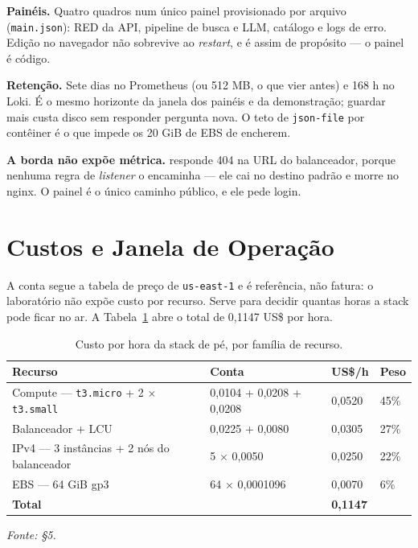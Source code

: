 \documentclass[11pt,a4paper]{article}
\begin{document}
\textbf{Painéis.} Quatro quadros num único painel provisionado por arquivo
(\texttt{main.json}): RED da API, pipeline de busca e LLM, catálogo e logs de erro. Edição no navegador não sobrevive ao
\emph{restart}, e é assim de propósito --- o painel é código.

\textbf{Retenção.} Sete dias no Prometheus (ou 512 MB, o que vier antes) e 168 h no Loki. É o mesmo
horizonte da janela dos painéis e da demonstração; guardar mais custa disco sem responder pergunta
nova. O teto de \texttt{json-file} por contêiner é o que impede os 20 GiB de EBS de encherem.

\textbf{A borda não expõe métrica.}  responde 404 na URL do balanceador, porque
nenhuma regra de \emph{listener} o encaminha --- ele cai no destino padrão e morre no nginx. O painel
é o único caminho público, e ele pede login.

\section{Custos e Janela de Operação}

A conta segue a tabela de preço de \texttt{us-east-1} e é referência, não fatura: o laboratório
não expõe custo por recurso. Serve para decidir quantas horas a stack pode ficar no ar. A
Tabela~\ref{tab:custo} abre o total de 0,1147 US\$ por hora.

\begin{table}[tb]
\caption{Custo por hora da stack de pé, por família de recurso.}
\label{tab:custo}
\centering\small
\begin{tabularx}{\textwidth}{p{6.6cm}p{4.4cm}p{2.2cm}X}
\toprule
\textbf{Recurso} & \textbf{Conta} & \textbf{US\$/h} & \textbf{Peso} \\
\midrule
Compute --- \texttt{t3.micro} + 2 $\times$ \texttt{t3.small} & 0,0104 + 0,0208 + 0,0208 & 0,0520 & 45\% \\
Balanceador + LCU & 0,0225 + 0,0080 & 0,0305 & 27\% \\
IPv4 --- 3 instâncias + 2 nós do balanceador & 5 $\times$ 0,0050 & 0,0250 & 22\% \\
EBS --- 64 GiB gp3 & 64 $\times$ 0,0001096 & 0,0070 & 6\% \\
\midrule
\textbf{Total} & & \textbf{0,1147} & \\
\bottomrule
\end{tabularx}
{\small\itshape Fonte:  §5.}
\end{table}
\end{document}
